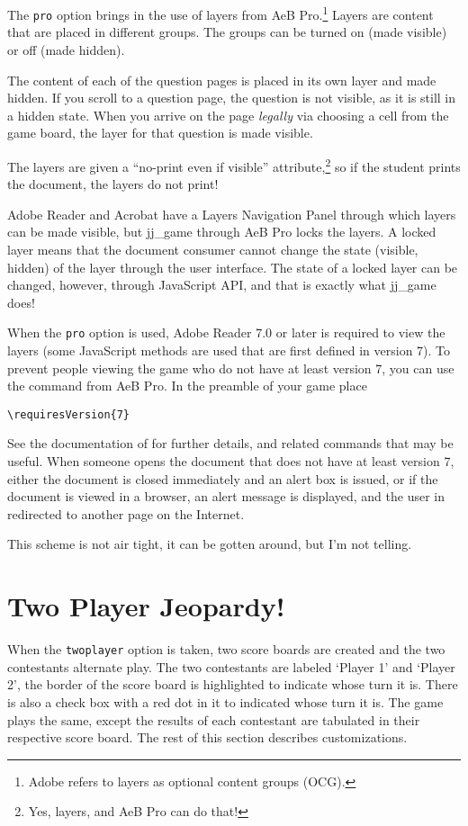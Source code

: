 \documentclass{article}
\def\jj{\textsf{jj\_game}}
\begin{document}
The \texttt{pro} option brings in the use of layers from AeB
Pro.\footnote{Adobe refers to layers as optional content groups
(OCG).} Layers are content that are placed in different groups. The
groups can be turned on (made visible) or off (made hidden).

The content of each of the question pages is placed in its own
layer and made hidden. If you scroll to a question page, the
question is not visible, as it is still in a hidden state. When you
arrive on the page \emph{legally} via choosing a cell from the game
board, the layer for that question is made visible.

The layers are given a ``no-print even if visible''
attribute,\footnote{Yes, layers, and AeB Pro can do that!} so if the
student prints the document, the layers do not print!

Adobe Reader and Acrobat have a Layers Navigation Panel through
which layers can be made visible, but {\jj} through AeB Pro locks
the layers. A locked layer means that the document consumer cannot
change the state (visible,  hidden) of the layer through the user
interface. The state of a locked layer can be changed, however,
through JavaScript API, and that is exactly what {\jj} does!

When the \texttt{pro} option is used, Adobe Reader 7.0 or later is
required to view the layers (some JavaScript methods are used that
are first defined in version 7).  To prevent people viewing the game
who do not have at least version 7, you can use the  command
 from AeB Pro. In the preamble of your game place
\begin{Verbatim}[xleftmargin=\amtIndent]
\requiresVersion{7}
\end{Verbatim}
See the documentation of  for further details,
and related commands that may be useful. When someone opens the
document that does not have at least version 7, either the document
is closed immediately and an alert box is issued, or if the document
is viewed in a browser, an alert message is displayed, and the user
in redirected to another page on the Internet.

This scheme is not air tight, it can be gotten around, but I'm not
telling.

\section{Two Player Jeopardy!}\label{tpj}

When the \texttt{twoplayer} option is taken, two score boards are
created and the two contestants alternate play. The two contestants
are labeled `Player 1' and `Player 2', the border of the score board
is highlighted to indicate whose turn it is.
There is also a check box with a red dot in it to indicated whose
turn it is. The game plays the same, except the
results of each contestant are tabulated in their respective score
board. The rest of this section describes customizations.
\end{document}
